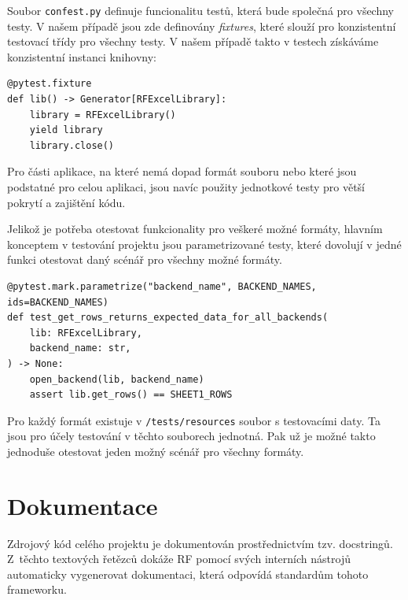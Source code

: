 Soubor \texttt{confest.py} definuje funcionalitu testů, která bude společná pro všechny testy. V našem případě jsou zde definovány \textit{fixtures}, které slouží pro konzistentní testovací třídy pro všechny testy. V našem případě takto v testech získáváme konzistentní instanci knihovny:

\begin{listing}[H]
    \begin{verbatim}
@pytest.fixture
def lib() -> Generator[RFExcelLibrary]:
    library = RFExcelLibrary()
    yield library
    library.close()
    \end{verbatim}
    
    \caption{Pytest fixture - vlastní tvorba}
    \label{list:demo-library}
\end{listing}

Pro části aplikace, na které nemá dopad formát souboru nebo které jsou podstatné pro celou aplikaci, jsou navíc použity jednotkové testy pro větší pokrytí a zajištění kódu.

Jelikož je potřeba otestovat funkcionality pro veškeré možné formáty, hlavním konceptem v testování projektu jsou parametrizované testy, které dovolují v jedné funkci otestovat daný scénář pro všechny možné formáty.

\begin{listing}[H]
    \begin{verbatim}
@pytest.mark.parametrize("backend_name", BACKEND_NAMES, ids=BACKEND_NAMES)
def test_get_rows_returns_expected_data_for_all_backends(
    lib: RFExcelLibrary,
    backend_name: str,
) -> None:
    open_backend(lib, backend_name)
    assert lib.get_rows() == SHEET1_ROWS
    \end{verbatim}
    
    \caption{Příklad parametrizovaného testu - vlastní tvorba}
    \label{list:demo-library}
\end{listing}

Pro každý formát existuje v \texttt{/tests/resources} soubor s testovacími daty. Ta jsou pro účely testování v těchto souborech jednotná. Pak už je možné takto jednoduše otestovat jeden možný scénář pro všechny formáty.

\section{Dokumentace}

Zdrojový kód celého projektu je dokumentován prostřednictvím tzv. docstringů. Z~těchto textových řetězců dokáže RF pomocí svých interních nástrojů automaticky vygenerovat dokumentaci, která odpovídá standardům tohoto frameworku.

